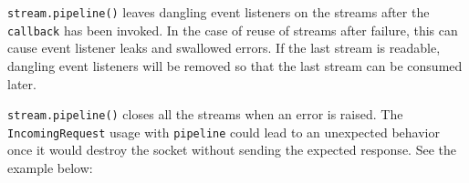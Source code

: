 \texttt{stream.pipeline()} leaves dangling event listeners on the
streams after the \texttt{callback} has been invoked. In the case of
reuse of streams after failure, this can cause event listener leaks and
swallowed errors. If the last stream is readable, dangling event
listeners will be removed so that the last stream can be consumed later.

\texttt{stream.pipeline()} closes all the streams when an error is
raised. The \texttt{IncomingRequest} usage with \texttt{pipeline} could
lead to an unexpected behavior once it would destroy the socket without
sending the expected response. See the example below:

\begin{Shaded}
\begin{Highlighting}[]
\OperatorTok{=} \NormalTok{(}\NormalTok{)}\OperatorTok{;}
\OperatorTok{=} \NormalTok{(}\NormalTok{)}\OperatorTok{;}
\OperatorTok{=} \NormalTok{(}\NormalTok{)}\OperatorTok{;}

\OperatorTok{=}\OperatorTok{,}\KeywordTok{=\textgreater{}}\NormalTok{ \{}
  \OperatorTok{=}\NormalTok{(}\NormalTok{)}\OperatorTok{;}
  \OperatorTok{,}\OperatorTok{,}\KeywordTok{=\textgreater{}}\NormalTok{ \{}
      \OperatorTok{;} 
      \NormalTok{(}\NormalTok{)}\OperatorTok{;}
\NormalTok{    \}}
\NormalTok{  \})}\OperatorTok{;}
\NormalTok{\})}\OperatorTok{;}
\end{Highlighting}
\end{Shaded}

